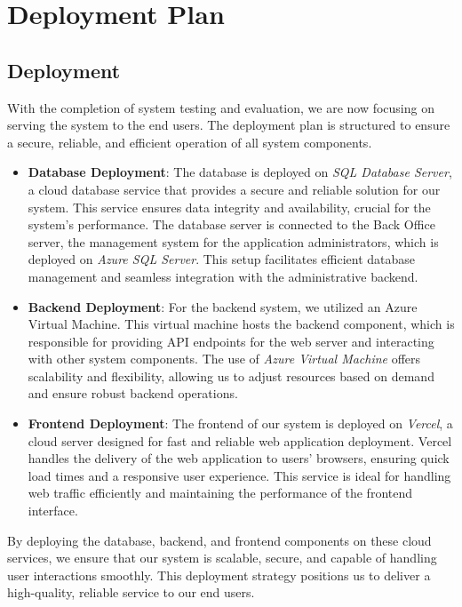 \chapter{Deployment Plan}

\section{Deployment}

With the completion of system testing and evaluation, we are now focusing on serving the system to the end users. The deployment plan is structured to ensure a secure, reliable, and efficient operation of all system components.

\begin{itemize}
    \item \textbf{Database Deployment}: The database is deployed on \textit{SQL Database Server}, a cloud database service that provides a secure and reliable solution for our system. This service ensures data integrity and availability, crucial for the system's performance. The database server is connected to the Back Office server, the management system for the application administrators, which is deployed on \textit{Azure SQL Server}. This setup facilitates efficient database management and seamless integration with the administrative backend.
    \item \textbf{Backend Deployment}: For the backend system, we utilized an Azure Virtual Machine. This virtual machine hosts the backend component, which is responsible for providing API endpoints for the web server and interacting with other system components. The use of \textit{Azure Virtual Machine} offers scalability and flexibility, allowing us to adjust resources based on demand and ensure robust backend operations.
    \item \textbf{Frontend Deployment}: The frontend of our system is deployed on \textit{Vercel}, a cloud server designed for fast and reliable web application deployment. Vercel handles the delivery of the web application to users' browsers, ensuring quick load times and a responsive user experience. This service is ideal for handling web traffic efficiently and maintaining the performance of the frontend interface.
\end{itemize}

By deploying the database, backend, and frontend components on these cloud services, we ensure that our system is scalable, secure, and capable of handling user interactions smoothly. This deployment strategy positions us to deliver a high-quality, reliable service to our end users.

